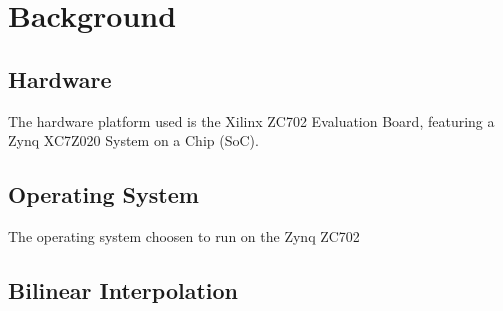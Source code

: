 
\chapter{Background}

\section{Hardware}
The hardware platform used is the Xilinx ZC702 Evaluation Board, featuring a Zynq\textsuperscript{\textregistered} XC7Z020 System on a Chip (SoC).

\section{Operating System}
The operating system choosen to run on the Zynq ZC702

\section{Bilinear Interpolation}
